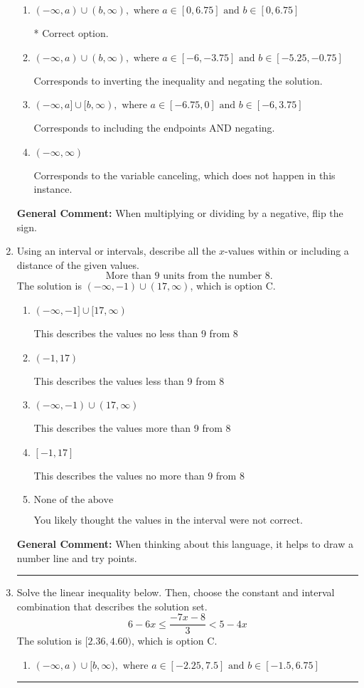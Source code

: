 \documentclass{extbook}[14pt]
\newcommand{\litem}[1]{\item #1

\rule{\textwidth}{0.4pt}}
\begin{document}
\begin{enumerate}
{\begin{enumerate}[label=\Alph*.]
Corresponds to including the endpoints (when they should be excluded).
\item \( (-\infty, a) \cup (b, \infty), \text{ where } a \in [0, 6.75] \text{ and } b \in [0, 6.75] \)

 * Correct option.
\item \( (-\infty, a) \cup (b, \infty), \text{ where } a \in [-6, -3.75] \text{ and } b \in [-5.25, -0.75] \)

Corresponds to inverting the inequality and negating the solution.
\item \( (-\infty, a] \cup [b, \infty), \text{ where } a \in [-6.75, 0] \text{ and } b \in [-6, 3.75] \)

Corresponds to including the endpoints AND negating.
\item \( (-\infty, \infty) \)

Corresponds to the variable canceling, which does not happen in this instance.
\end{enumerate}

\textbf{General Comment:} When multiplying or dividing by a negative, flip the sign.
}
\litem{
Using an interval or intervals, describe all the $x$-values within or including a distance of the given values.
\[ \text{ More than } 9 \text{ units from the number } 8. \]The solution is \( (-\infty, -1) \cup (17, \infty) \), which is option C.\begin{enumerate}[label=\Alph*.]
\item \( (-\infty, -1] \cup [17, \infty) \)

This describes the values no less than 9 from 8
\item \( (-1, 17) \)

This describes the values less than 9 from 8
\item \( (-\infty, -1) \cup (17, \infty) \)

This describes the values more than 9 from 8
\item \( [-1, 17] \)

This describes the values no more than 9 from 8
\item \( \text{None of the above} \)

You likely thought the values in the interval were not correct.
\end{enumerate}

\textbf{General Comment:} When thinking about this language, it helps to draw a number line and try points.
}
\litem{
Solve the linear inequality below. Then, choose the constant and interval combination that describes the solution set.
\[ 6 - 6 x \leq \frac{-7 x - 8}{3} < 5 - 4 x \]The solution is \( [2.36, 4.60) \), which is option C.\begin{enumerate}[label=\Alph*.]
\item \( (-\infty, a) \cup [b, \infty), \text{ where } a \in [-2.25, 7.5] \text{ and } b \in [-1.5, 6.75] \)


\end{enumerate}}
\end{enumerate}
\end{document}
